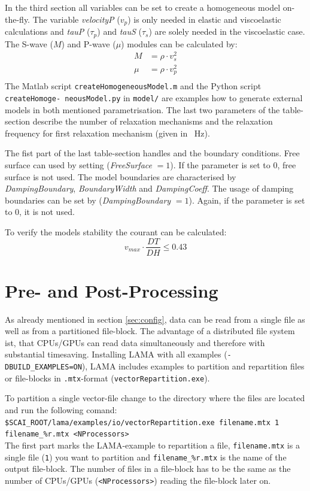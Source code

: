 \documentclass[pdftex,a4paper,parskip,listof=totoc,bibliography=totoc,onehalfspacing,12pt]{scrreprt}
\newcommand{\shellcmd}[1]{\indent\indent\texttt{#1}}	%
\newcommand{\shellcmdline}[1]{\indent\indent\texttt{\quad#1}} 	%
\begin{document}
In the third section all variables can be set to create a homogeneous model on-the-fly. The variable \textit{velocityP} ($v_p$) is only needed in elastic and viscoelastic calculations and  \textit{tauP} ($\tau_p$) and \textit{tauS} ($\tau_s$) are solely needed in the viscoelastic case. 
The S-wave ($M$) and P-wave ($\mu$) modules can be calculated by:
\begin{align*}
	M&=\rho\cdot v_s^2\\
	\mu &=\rho\cdot v_p^2\\
\end{align*}
The Matlab script \shellcmd{createHomogeneousModel.m} and the Python script \shellcmd{createHomoge- neousModel.py} in \shellcmd{model/} are examples how to generate external models in both mentioned parametrisation. 
The last two parameters of the table-section describe the number of relaxation mechanisms and the relaxation frequency for first relaxation mechanism (given in \SI{}{Hz}).

The fist part of the last table-section handles and the boundary conditions. Free surface can used by setting (\textit{FreeSurface} $=1$). If the parameter is set to 0, free surface is not used. 
The model boundaries are characterised by \textit{DampingBoundary}, \textit{BoundaryWidth} and \textit{DampingCoeff}. The usage of damping boundaries can be set by (\textit{DampingBoundary} $=1$). Again, if the parameter is set to 0, it is not used. 


To verify the models stability  the courant can be calculated: 
\begin{equation*}
	v_{max} \cdot \frac{DT}{DH} \leq 0.43
\end{equation*}

\clearpage
\section{Pre- and Post-Processing}\label{sec:process}

As already mentioned in section \ref{sec:config}, data can be read from a single file as well as from a partitioned file-block. The advantage of a distributed file system ist, that CPUs/GPUs can read data simultaneously and therefore with substantial timesaving. Installing LAMA with all examples (\shellcmd{-DBUILD\_EXAMPLES=ON}), LAMA includes examples to partition and repartition files or file-blocks in \shellcmd{.mtx}-format (\shellcmd{vectorRepartition.exe}). 

To partition a single vector-file change to the directory where the files are located and run the following comand:  \\
\shellcmdline{\$SCAI\_ROOT/lama/examples/io/vectorRepartition.exe filename.mtx 1 }\\
\shellcmdline{filename\_\%r.mtx <NProcessors>}\\
The first part marks the LAMA-example to repartition a file, \shellcmd{filename.mtx} is a single file (\shellcmd{1}) you want to partition and \shellcmd{filename\_\%r.mtx} is the name of the output file-block. The number of files in a file-block has to be the same as the number of CPUs/GPUs (\shellcmd{<NProcessors>}) reading the file-block later on. 
\end{document}
